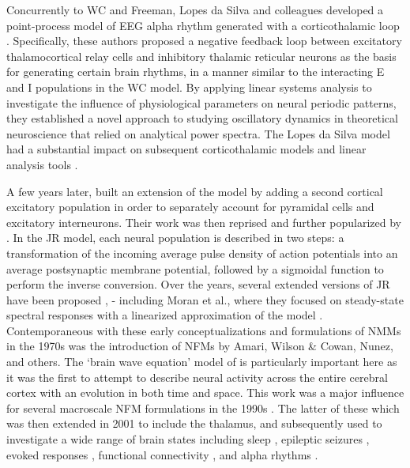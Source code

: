 \documentclass[12pt,twoside]{article}
\begin{document}
Concurrently to WC and Freeman, Lopes da Silva and colleagues developed a point-process model of EEG alpha rhythm generated with a corticothalamic loop \citep{lopes1974model}. Specifically, these authors proposed a negative feedback loop between excitatory thalamocortical relay cells and inhibitory thalamic reticular neurons as the basis for generating certain brain rhythms, in a manner similar to the interacting E and I populations in the WC model. By applying linear systems analysis to investigate the influence of physiological parameters on neural periodic patterns, they established a novel approach to studying oscillatory dynamics in theoretical neuroscience that relied on analytical power spectra.
The Lopes da Silva model had a substantial impact on subsequent corticothalamic models and linear analysis tools \citep{cona2014thalamo,bhattacharya2011thalamo}.

A few years later, \citet{zetterberg1978performance} %
built an extension of the model by adding a second cortical excitatory population in order to separately account for pyramidal cells and excitatory interneurons. Their work was then reprised and further popularized by \citet{jansen1995electroencephalogram}. In the JR model, each neural population is described in two steps: a transformation of the incoming average pulse density of action potentials into an average postsynaptic membrane potential, followed by a sigmoidal function to perform the inverse conversion. Over the years, several extended versions of JR have been proposed \citep{wendling2000relevance, david2003neural, zavaglia2006neural, sotero2007realistically}, - including Moran et al., where they focused on steady-state spectral responses with a linearized approximation of the model \citep{moran2007neural}. Contemporaneous with these early conceptualizations and formulations of NMMs in the 1970s was the introduction of NFMs by Amari, Wilson \& Cowan, Nunez, and others. The `brain wave equation' model of \citep{nunez1974brain} is particularly important here as it was the first to attempt to describe neural activity across the entire cerebral cortex with an evolution in both time and space. This work was a major influence for several macroscale NFM formulations in the 1990s \citep{jirsa1996field, wright1996dynamics, robinson1997propagation}. The latter of these which was then extended in 2001 to include the thalamus, and subsequently used to investigate a wide range of brain states including sleep \citep{robinson2005multiscale, abeysuriya2014prediction}, epileptic seizures \citep{zhao2015generalized, breakspear2006unifying}, evoked responses \citep{kerr2008physiology}, functional connectivity \citep{robinson2014determination}, and alpha rhythms \citep{robinson2002dynamics, robinson2005multiscale}.
\end{document}
